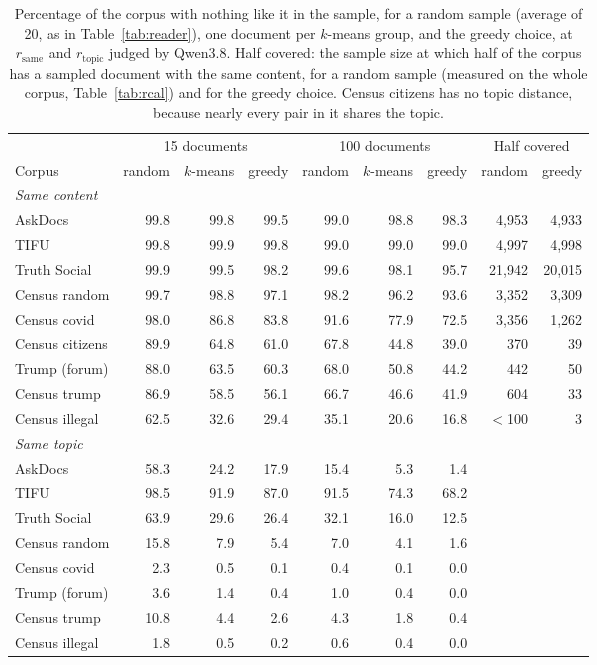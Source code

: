\begin{table}[t]
\centering
\small
\begin{tabular}{lrrrrrrrr}
\toprule
 & \multicolumn{3}{c}{15 documents} & \multicolumn{3}{c}{100 documents} & \multicolumn{2}{c}{Half covered} \\
\cmidrule(lr){2-4}\cmidrule(lr){5-7}\cmidrule(lr){8-9}
Corpus & random & $k$-means & greedy & random & $k$-means & greedy & random & greedy \\
\midrule
\multicolumn{9}{l}{\emph{Same content}} \\
AskDocs & 99.8 & 99.8 & 99.5 & 99.0 & 98.8 & 98.3 & 4{,}953 & 4{,}933 \\
TIFU & 99.8 & 99.9 & 99.8 & 99.0 & 99.0 & 99.0 & 4{,}997 & 4{,}998 \\
Truth Social & 99.9 & 99.5 & 98.2 & 99.6 & 98.1 & 95.7 & 21{,}942 & 20{,}015 \\
Census random & 99.7 & 98.8 & 97.1 & 98.2 & 96.2 & 93.6 & 3{,}352 & 3{,}309 \\
Census covid & 98.0 & 86.8 & 83.8 & 91.6 & 77.9 & 72.5 & 3{,}356 & 1{,}262 \\
Census citizens & 89.9 & 64.8 & 61.0 & 67.8 & 44.8 & 39.0 & 370 & 39 \\
Trump (forum) & 88.0 & 63.5 & 60.3 & 68.0 & 50.8 & 44.2 & 442 & 50 \\
Census trump & 86.9 & 58.5 & 56.1 & 66.7 & 46.6 & 41.9 & 604 & 33 \\
Census illegal & 62.5 & 32.6 & 29.4 & 35.1 & 20.6 & 16.8 & $<$100 & 3 \\
\multicolumn{9}{l}{\emph{Same topic}} \\
AskDocs & 58.3 & 24.2 & 17.9 & 15.4 & 5.3 & 1.4 &  &  \\
TIFU & 98.5 & 91.9 & 87.0 & 91.5 & 74.3 & 68.2 &  &  \\
Truth Social & 63.9 & 29.6 & 26.4 & 32.1 & 16.0 & 12.5 &  &  \\
Census random & 15.8 & 7.9 & 5.4 & 7.0 & 4.1 & 1.6 &  &  \\
Census covid & 2.3 & 0.5 & 0.1 & 0.4 & 0.1 & 0.0 &  &  \\
Trump (forum) & 3.6 & 1.4 & 0.4 & 1.0 & 0.4 & 0.0 &  &  \\
Census trump & 10.8 & 4.4 & 2.6 & 4.3 & 1.8 & 0.4 &  &  \\
Census illegal & 1.8 & 0.5 & 0.2 & 0.6 & 0.4 & 0.0 &  &  \\
\bottomrule
\end{tabular}
\caption{Percentage of the corpus with nothing like it in the sample, for a random sample (average of 20, as in Table~\ref{tab:reader}), one document per $k$-means group, and the greedy choice, at $r_{\mathrm{same}}$ and $r_{\mathrm{topic}}$ judged by Qwen3.8. Half covered: the sample size at which half of the corpus has a sampled document with the same content, for a random sample (measured on the whole corpus, Table~\ref{tab:rcal}) and for the greedy choice. Census citizens has no topic distance, because nearly every pair in it shares the topic.}
\label{tab:design}
\end{table}
